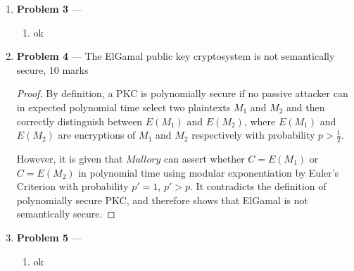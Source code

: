 \documentclass[11pt]{article}
\theoremstyle{definition}
\newcommand{\M}{Mallory}
\begin{document}
\begin{enumerate}
\newpage

\item[] \textbf{Problem 3} --- 

\begin{enumerate}
  \item ok
\end{enumerate}

\newpage

\item[] \textbf{Problem 4} --- The ElGamal public key cryptosystem is not semantically secure, 10 marks

\begin{proof}
  By definition, a PKC is polynomially secure if no passive attacker can in expected polynomial time select two plaintexts $M_1$ and $M_2$ and then correctly distinguish between $E(M_1)$ and $E(M_2)$, where $E(M_1)$ and $E(M_2)$ are encryptions of $M_1$ and $M_2$ respectively with probability $p > \frac{1}{2}$.

  However, it is given that $\M$ can assert whether $C = E(M_1)$ or $C = E(M_2)$ in polynomial time using modular exponentiation by Euler's Criterion with probability $p' = 1$, $p' > p$. It contradicts the definition of polynomially secure PKC, and therefore shows that ElGamal is not semantically secure.
\end{proof}

\newpage

\item[] \textbf{Problem 5} --- 

\begin{enumerate}
  \item ok
\end{enumerate}

\newpage

\end{enumerate}
\end{document}
